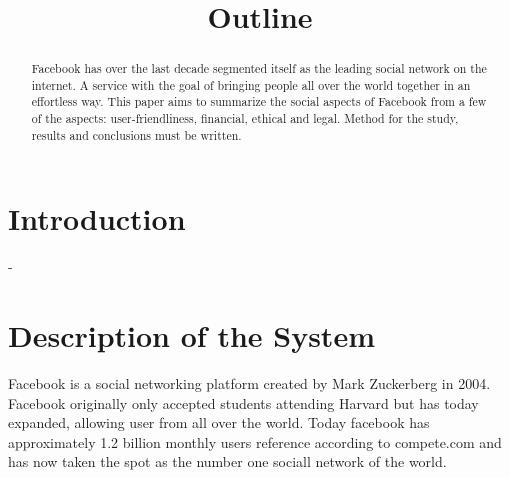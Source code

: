 \documentclass[conference]{IEEEtran}
\begin{document}
\title{Outline}


\author{
\and

\and

\and

}


\maketitle


\begin{abstract}
Facebook has over the last decade segmented itself as the leading social
network on the internet.
A service with the goal of bringing people all over the world together in an
effortless way. This paper aims to summarize the social aspects of Facebook
from a few of the aspects: user-friendliness, financial, ethical and legal. 
Method for the study, results and conclusions must be written. 
\end{abstract}

\section{Introduction}
-
\section{Description of the System}
\label{system}

Facebook is a social networking platform created by Mark Zuckerberg in 2004.
Facebook originally only accepted students attending Harvard but has today
expanded, allowing user from all over the world. Today facebook has
approximately 1.2 billion monthly users reference according to compete.com and
has now taken the spot as the number one sociall network of the world.
\end{document}
